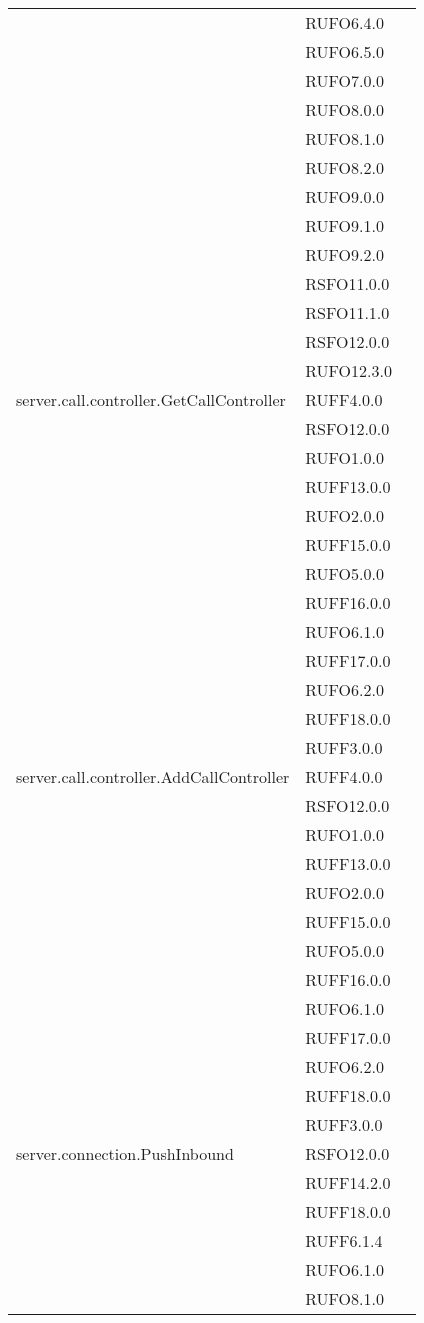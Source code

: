 \begin{center}
\begin{longtable}{lp{}l}
 & RUFO6.4.0 \\
 & RUFO6.5.0 \\
 & RUFO7.0.0 \\
 & RUFO8.0.0 \\
 & RUFO8.1.0 \\
 & RUFO8.2.0 \\
 & RUFO9.0.0 \\
 & RUFO9.1.0 \\
 & RUFO9.2.0 \\
 & RSFO11.0.0 \\
 & RSFO11.1.0 \\
 & RSFO12.0.0 \\
 & RUFO12.3.0 \\
server.call.controller.GetCallController & RUFF4.0.0 \\
 & RSFO12.0.0 \\
 & RUFO1.0.0 \\
 & RUFF13.0.0 \\
 & RUFO2.0.0 \\
 & RUFF15.0.0 \\
 & RUFO5.0.0 \\
 & RUFF16.0.0 \\
 & RUFO6.1.0 \\
 & RUFF17.0.0 \\
 & RUFO6.2.0 \\
 & RUFF18.0.0 \\
 & RUFF3.0.0 \\
server.call.controller.AddCallController & RUFF4.0.0 \\
 & RSFO12.0.0 \\
 & RUFO1.0.0 \\
 & RUFF13.0.0 \\
 & RUFO2.0.0 \\
 & RUFF15.0.0 \\
 & RUFO5.0.0 \\
 & RUFF16.0.0 \\
 & RUFO6.1.0 \\
 & RUFF17.0.0 \\
 & RUFO6.2.0 \\
 & RUFF18.0.0 \\
 & RUFF3.0.0 \\
server.connection.PushInbound & RSFO12.0.0 \\
 & RUFF14.2.0 \\
 & RUFF18.0.0 \\
 & RUFF6.1.4 \\
 & RUFO6.1.0 \\
 & RUFO8.1.0 \\

\end{longtable}
\end{center}
